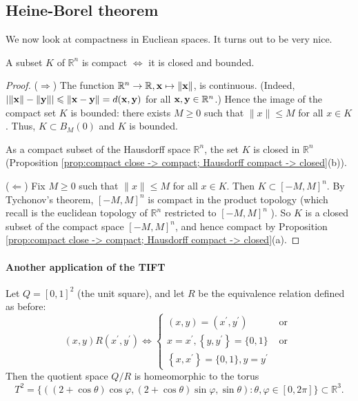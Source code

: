 \documentclass[a4paper,11pt]{article}
\begin{document}
\subsection{Heine-Borel theorem}
We now look at compactness in Eucliean spaces. It turns out to be very nice.
\begin{theorem}\label{thm:Heine-Borel}
    A subset $K$ of $\mathbb{R}^{n}$ is compact $\Longleftrightarrow$ it is closed and bounded.
\end{theorem}
\begin{proof}
    ($ \Longrightarrow $) The function $\mathbb{R}^{n} \rightarrow \mathbb{R}, {\bf x} \mapsto\|{\bf x}\|$, is continuous. (Indeed, $|\|{\bf x}\|-\|{\bf y}\|| \leqslant\|{\bf x}-{\bf y}\|=d({\bf x}, {\bf y})$ for all ${\bf x}, {\bf y} \in \mathbb{R}^{n}$.) Hence the image of the compact set $K$ is bounded: there exists $M \geqslant 0$ such that $\|x\| \leqslant M$ for all $x \in K$. Thus, $K \subset B_{M}(0)$ and $K$ is bounded.

    As a compact subset of the Hausdorff space $\mathbb{R}^{n}$, the set $K$ is closed in $\mathbb{R}^{n}$ (Proposition \ref{prop:compact close -> compact; Hausdorff compact -> closed}(b)).

    ($ \Longleftarrow$) Fix $M \geqslant 0$ such that $\|x\| \leqslant M$ for all $x \in K$. Then $K \subset[-M, M]^{n}$. By Tychonov's theorem, $[-M, M]^{n}$ is compact in the product topology (which recall is the euclidean topology of $\mathbb{R}^{n}$ restricted to $[-M, M]^{n}$ ). So $K$ is a closed subset of the compact space $[-M, M]^{n}$, and hence compact by Proposition \ref{prop:compact close -> compact; Hausdorff compact -> closed}(a).
\end{proof}

\paragraph*{Another application of the TIFT} Let $Q=[0,1]^{2}$ (the unit square), and let $R$ be the equivalence relation defined as before: 
$$
(x, y) R\left(x^{\prime}, y^{\prime}\right) \Longleftrightarrow \begin{cases}(x, y)=\left(x^{\prime}, y^{\prime}\right) & \text { or } \\ x=x^{\prime},\left\{y, y^{\prime}\right\}=\{0,1\} & \text { or } \\ \left\{x, x^{\prime}\right\}=\{0,1\}, y=y^{\prime} & \end{cases}
$$
Then the quotient space $Q / R$ is homeomorphic to the torus
$$
T^{2}=\{((2+\cos \theta) \cos \varphi,(2+\cos \theta) \sin \varphi, \sin \theta): \theta, \varphi \in[0,2 \pi]\} \subset \mathbb{R}^{3}.
$$
\end{document}
